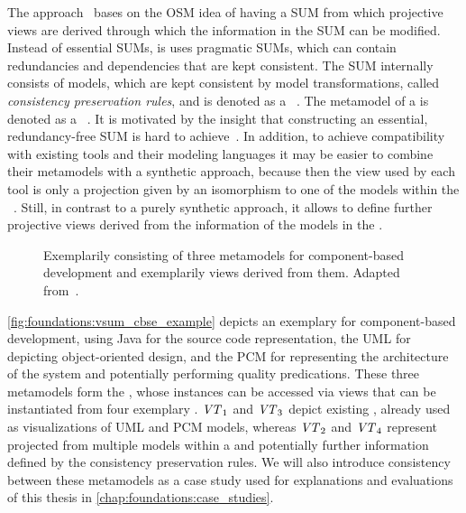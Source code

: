 The \vitruv approach~ bases on the \gls{OSM} idea of having a \gls{SUM} from which projective views are derived through which the information in the \gls{SUM} can be modified.
Instead of essential \glspl{SUM}, is uses pragmatic \glspl{SUM}, which can contain redundancies and dependencies that are kept consistent.
The \gls{SUM} internally consists of models, which are kept consistent by model transformations, called \emph{consistency preservation rules}, and is denoted as a \vsum~.
The metamodel of a \vsum is denoted as a \vsumm~.
It is motivated by the insight that constructing an essential, redundancy-free \gls{SUM} is hard to achieve~.
In addition, to achieve compatibility with existing tools and their modeling languages it may be easier to combine their metamodels with a synthetic approach, because then the view used by each tool is only a projection given by an isomorphism to one of the models within the \vsum~.
Still, in contrast to a purely synthetic approach, it allows to define further projective views derived from the information of the models in the \vsum.

\begin{figure}
    \centering
    
    \caption[Exemplary \acrshort{VSUMM}]{Exemplarily \vsumm consisting of three metamodels for component-based development and exemplarily views derived from them. Adapted from~\cite[Fig.~4.4]{langhammer2017a}.}
    \label{fig:foundations:vsum_cbse_example}
\end{figure}

\autoref{fig:foundations:vsum_cbse_example} depicts an exemplary \vsumm for component-based development, using Java for the source code representation, the \gls{UML} for depicting object-oriented design, and the \gls{PCM} for representing the architecture of the system and potentially performing quality predications.
These three metamodels form the \vsumm, whose instances can be accessed via views that can be instantiated from four exemplary \viewtypes.
$\mathit{VT}_1$ and $\mathit{VT}_3$ depict existing \viewtypes, already used as visualizations of \gls{UML} and \gls{PCM} models, whereas $\mathit{VT}_2$ and $\mathit{VT}_4$ represent \viewtypes projected from multiple models within a \vsum and potentially further information defined by the consistency preservation rules.
We will also introduce consistency between these metamodels as a case study used for explanations and evaluations of this thesis in \autoref{chap:foundations:case_studies}.

